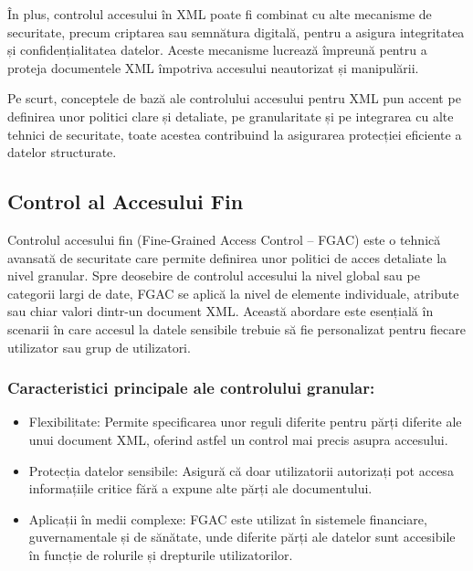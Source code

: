 \documentclass[runningheads]{llncs}
\begin{document}
În plus, controlul accesului în XML poate fi combinat cu alte mecanisme de securitate, precum criptarea sau semnătura digitală, pentru a asigura integritatea și confidențialitatea datelor. Aceste mecanisme lucrează împreună pentru a proteja documentele XML împotriva accesului neautorizat și manipulării.

Pe scurt, conceptele de bază ale controlului accesului pentru XML pun accent pe definirea unor politici clare și detaliate, pe granularitate și pe integrarea cu alte tehnici de securitate, toate acestea contribuind la asigurarea protecției eficiente a datelor structurate.



\subsection{Control al Accesului Fin}

Controlul accesului fin (Fine-Grained Access Control – FGAC) este o tehnică avansată de securitate care permite definirea unor politici de acces detaliate la nivel granular. Spre deosebire de controlul accesului la nivel global sau pe categorii largi de date, FGAC se aplică la nivel de elemente individuale, atribute sau chiar valori dintr-un document XML. Această abordare este esențială în scenarii în care accesul la datele sensibile trebuie să fie personalizat pentru fiecare utilizator sau grup de utilizatori.

\subsubsection{Caracteristici principale ale controlului granular:}

\begin{itemize}

    \item Flexibilitate: Permite specificarea unor reguli diferite pentru părți diferite ale unui document XML, oferind astfel un control mai precis asupra accesului.
    
    \item Protecția datelor sensibile: Asigură că doar utilizatorii autorizați pot accesa informațiile critice fără a expune alte părți ale documentului.
    
    \item Aplicații în medii complexe: FGAC este utilizat în sistemele financiare, guvernamentale și de sănătate, unde diferite părți ale datelor sunt accesibile în funcție de rolurile și drepturile utilizatorilor.
    
\end{itemize}
\end{document}

